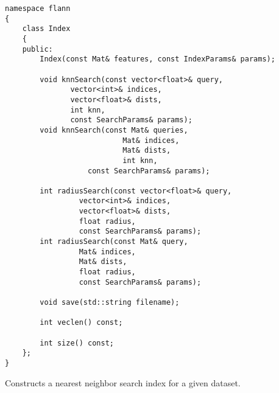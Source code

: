 \begin{lstlisting}
namespace flann
{
    class Index 
    {
    public:
	    Index(const Mat& features, const IndexParams& params);

	    void knnSearch(const vector<float>& query, 
			   vector<int>& indices, 
			   vector<float>& dists, 
			   int knn, 
			   const SearchParams& params);
	    void knnSearch(const Mat& queries, 
                           Mat& indices, 
                           Mat& dists, 
                           int knn, 
		           const SearchParams& params);

	    int radiusSearch(const vector<float>& query, 
			     vector<int>& indices, 
			     vector<float>& dists, 
			     float radius, 
			     const SearchParams& params);
	    int radiusSearch(const Mat& query, 
			     Mat& indices, 
			     Mat& dists, 
			     float radius, 
			     const SearchParams& params);

	    void save(std::string filename);

	    int veclen() const;

	    int size() const;
    };
}
\end{lstlisting}

Constructs a nearest neighbor search index for a given dataset.

